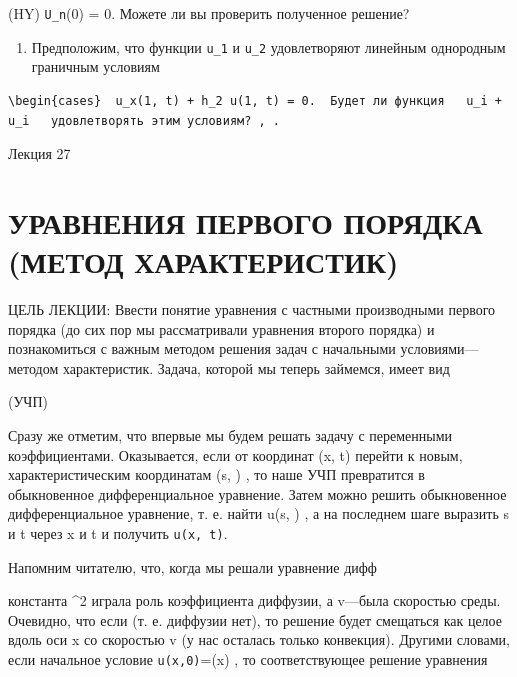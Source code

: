 \documentclass[
  ukrainian,
]{article}
\providecommand{\tightlist}{%
  \setlength{\itemsep}{0pt}\setlength{\parskip}{0pt}}
\begin{document}
(HY) \texttt{U\_n}(0) = 0. Можете ли вы проверить полученное решение?

\begin{enumerate}
\def\labelenumi{\arabic{enumi}.}
\setcounter{enumi}{5}
\tightlist
\item
  Предположим, что функции \texttt{u\_1} и \texttt{u\_2} удовлетворяют
  линейным однородным граничным условиям
\end{enumerate}

\begin{verbatim}
\begin{cases}  u_x(1, t) + h_2 u(1, t) = 0.  Будет ли функция   u_i + u_i   удовлетворять этим условиям? , .
\end{verbatim}

Лекция 27

\section{УРАВНЕНИЯ ПЕРВОГО ПОРЯДКА (МЕТОД
ХАРАКТЕРИСТИК)}\label{ux443ux440ux430ux432ux43dux435ux43dux438ux44f-ux43fux435ux440ux432ux43eux433ux43e-ux43fux43eux440ux44fux434ux43aux430-ux43cux435ux442ux43eux434-ux445ux430ux440ux430ux43aux442ux435ux440ux438ux441ux442ux438ux43a}

ЦЕЛЬ ЛЕКЦИИ: Ввести понятие уравнения с частными производными первого
порядка (до сих пор мы рассматривали уравнения второго порядка) и
познакомиться с важным методом решения задач с начальными
условиями---методом характеристик. Задача, которой мы теперь займемся,
имеет вид

(УЧП)

Сразу же отметим, что впервые мы будем решать задачу с переменными
коэффициентами. Оказывается, если от координат (x, t) перейти к новым,
характеристическим координатам (s, \tau) , то наше УЧП превратится в
обыкновенное дифференциальное уравнение. Затем можно решить обыкновенное
дифференциальное уравнение, т. е. найти u(s, \tau) , а на последнем шаге
выразить s и t через x и t и получить \texttt{u(x,\ t)}.

Напомним читателю, что, когда мы решали уравнение дифф

константа \alpha\^{}2 играла роль коэффициента диффузии, а v---была
скоростью среды. Очевидно, что если  (т. е. диффузии нет), то
решение будет смещаться как целое вдоль оси x со скоростью v (у нас
осталась только конвекция). Другими словами, если начальное условие
\texttt{u(x,0)}=\varphi(x) , то соответствующее решение уравнения
\end{document}
